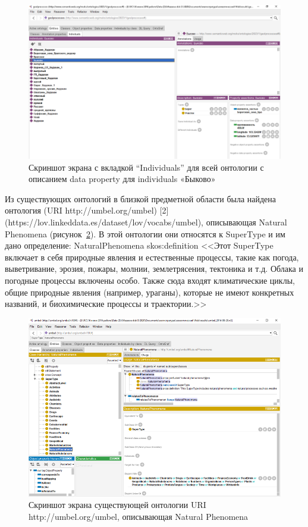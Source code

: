 \documentclass[732,14pt,final]{studrep}
\begin{document}
\begin{center}
  \begin{figure}[htp]
	\centering
	\includegraphics[width=0.9\linewidth]{pics/image5.png}
    \caption{Скриншот экрана с вкладкой “Individuals” для всей онтологии с описанием data property для individuals «Быково»}
    \label{fig:bykovo-instance}
  \end{figure}
\end{center}

Из существующих онтологий в близкой предметной области была найдена онтология (URI http://umbel.org/umbel) [2] (https://lov.linkeddata.es/dataset/lov/vocabs/umbel), описывающая Natural Phenomena (рисунок~\ref{fig:umbel}). В этой онтологии они относятся к SuperType и им дано определение: NaturalPhenomena skos:definition <<Этот SuperType включает в себя природные явления и естественные процессы, такие как погода, выветривание, эрозия, пожары, молнии, землетрясения, тектоника и т.д. Облака и погодные процессы включены особо. Также сюда входят климатические циклы, общие природные явления (например, ураганы), которые не имеют конкретных названий, и биохимические процессы и траектории.>>

\begin{center}
  \begin{figure}[htp]
	\centering
	\includegraphics[width=0.9\linewidth]{pics/image14.png}
    \caption{Скриншот экрана существующей онтологии URI http://umbel.org/umbel, описывающая Natural Phenomena}
    \label{fig:umbel}
  \end{figure}
\end{center}
\end{document}
